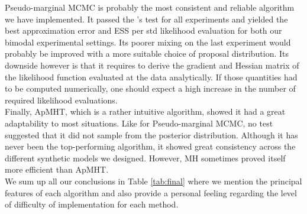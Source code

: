 \documentclass[11pt,a4paper]{report}\usepackage[]{graphicx}\usepackage[]{color}
\begin{document}
Pseudo-marginal MCMC is probably the most consistent and reliable algorithm we have implemented. It passed the \cite{geweke2004getting}'s test for all experiments and yielded the best approximation error and ESS per std likelihood evaluation for both our bimodal experimental settings. Its poorer mixing on the last experiment would probably be improved with a more suitable choice of proposal distribution. Its downside however is that it requires to derive the gradient and Hessian matrix of the likelihood function evaluated at the data analytically. If those quantities had to be computed numerically, one should expect a high increase in the number of required likelihood evaluations.\\

Finally, ApMHT, which is a rather intuitive algorithm, showed it had a great adaptability to most situations. Like for Pseudo-marginal MCMC, no test suggested that it did not sample from the posterior distribution. Although it has never been the top-performing algorithm, it showed great consistency across the different synthetic models we designed. However, MH sometimes proved itself more efficient than ApMHT.\\

We sum up all our conclusions in Table \ref{tab:final} where we mention the principal features of each algorithm and also provide a personal feeling regarding the level of difficulty of implementation for each method.
\end{document}
